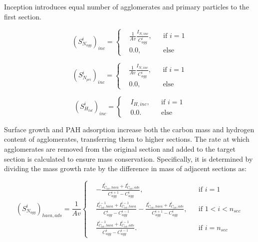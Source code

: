 
Inception introduces equal number of agglomerates and primary particles to the first section.

\begin{equation}
	\left(S^i_{N_{agg}}\right)_{inc} =
	\left\{
	\begin{aligned}
		&\frac{1}{Av}\frac{I_{N, inc}}{C^i_{agg}}, && \text{if } i=1\\
		& 0.0                                   , && \text{else}
	\end{aligned}
	\right.
	\label{eqn:S_Nagg_incsect}
\end{equation}

\begin{equation}
	\left(S^i_{N_{pri}}\right)_{inc} =
	\left\{
	\begin{aligned}
		&\frac{1}{Av}\frac{I_{N, inc}}{C^i_{agg}}, && \text{if } i=1\\
		& 0.0                                   , && \text{else}
	\end{aligned}
	\right.
	\label{eqn:S_Npri_incsect}
\end{equation}


\begin{equation}
	\left(S^i_{H_{tot}}\right)_{inc} =
	\left\{
	\begin{aligned}
		&I_{H, inc},  && \text{if } i=1\\
		& 0.0       . && \text{else}
	\end{aligned}
	\right.
	\label{eqn:S_Htot_incsect}
\end{equation}

Surface growth and PAH adsorption increase both the carbon mass and hydrogen content of agglomerates, transferring them to higher sections. The rate at which agglomerates are removed from the original section and added to the target section is calculated to ensure mass conservation. Specifically, it is determined by dividing the mass growth rate by the difference in mass of adjacent sections as:


\begin{equation}
	\left(S^i_{N_{agg}}\right)_{haca, ads}=
	\frac{1}{Av}
	\left\{
	\begin{aligned}
		&-\frac{I^i_{C_{tot},haca}+I^i_{C_{tot},ads}}{C^{i+1}_{agg}-C^{i}_{agg}},
		&&
		\text{if } i = 1
		\\
		&\frac{I^{i-1}_{C_{tot},haca}+I^{i-1}_{C_{tot},haca}}{C^{i}_{agg}-C^{i-1}_{agg}}
		-\frac{I^{i}_{C_{tot},haca}+I^{i}_{C_{tot},ads}}{C^{i+1}_{agg}-C^{i}_{agg}},
		&&
		\text{if } 1 < i < n_{sec}
		\\
		&\frac{I^{i-1}_{C_{tot},haca}+I^{i-1}_{C_{tot},ads}}{C^{i}_{agg}-C^{i-1}_{agg}}.
		&&\text{if } i=n_{sec}
	\end{aligned}
	\right.
	\label{eqn:S_Nagg_gradssect}
\end{equation}


